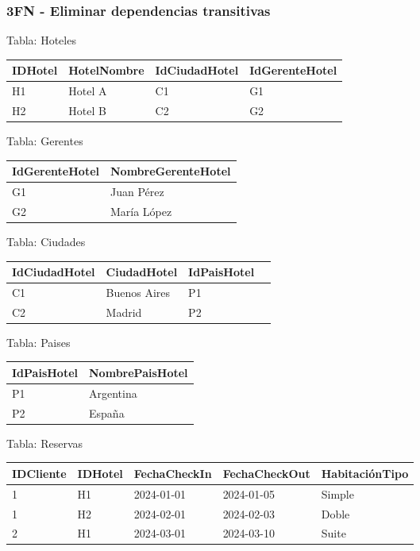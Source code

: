 \documentclass[12pt]{article}
\begin{document}
\subsubsection{3FN - Eliminar dependencias transitivas}
Tabla: Hoteles
\begin{center}
\begin{tabular}{llll}
\toprule
IDHotel & HotelNombre & IdCiudadHotel & IdGerenteHotel \\
\midrule
H1 & Hotel A & C1 & G1\\
H2 & Hotel B & C2 & G2\\
\bottomrule
\end{tabular}
\end{center}

Tabla: Gerentes
\begin{center}
\begin{tabular}{ll}
\toprule
IdGerenteHotel & NombreGerenteHotel \\
\midrule
G1 & Juan Pérez \\
G2 & María López \\
\bottomrule
\end{tabular}
\end{center}

Tabla: Ciudades
\begin{center}
\begin{tabular}{llll}
\toprule
IdCiudadHotel & CiudadHotel & IdPaisHotel \\
\midrule
C1 & Buenos Aires & P1\\
C2 & Madrid & P2\\
\bottomrule
\end{tabular}
\end{center}

Tabla: Paises
\begin{center}
\begin{tabular}{ll}
\toprule
IdPaisHotel & NombrePaisHotel \\
\midrule
P1 & Argentina \\
P2 & España \\
\bottomrule
\end{tabular}
\end{center}

Tabla: Reservas
\begin{center}
\begin{tabular}{lllll}
\toprule
IDCliente & IDHotel & FechaCheckIn & FechaCheckOut & HabitaciónTipo \\
\midrule
1 & H1 & 2024-01-01 & 2024-01-05 & Simple \\
1 & H2 & 2024-02-01 & 2024-02-03 & Doble \\
2 & H1 & 2024-03-01 & 2024-03-10 & Suite \\
\bottomrule
\end{tabular}
\end{center}
\end{document}
